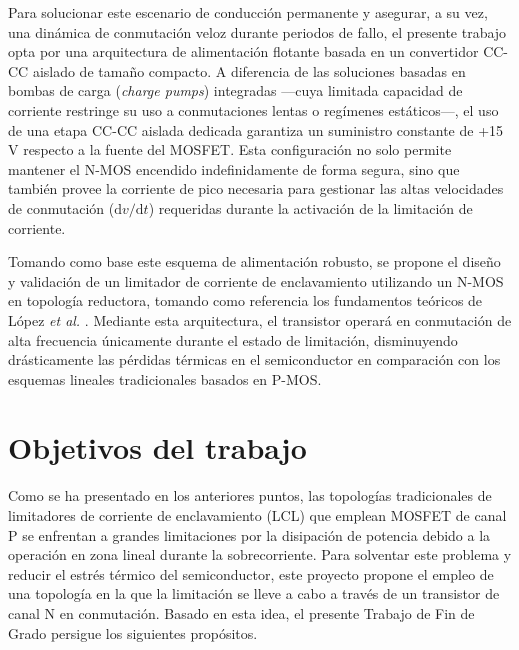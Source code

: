 \documentclass[12pt]{report} %
\begin{document}
Para solucionar este escenario de conducción permanente y asegurar, a su vez, una dinámica de conmutación veloz durante periodos de fallo, el presente trabajo opta por una arquitectura de alimentación flotante basada en un convertidor CC-CC aislado de tamaño compacto. A diferencia de las soluciones basadas en bombas de carga (\textit{charge pumps}) integradas —cuya limitada capacidad de corriente restringe su uso a conmutaciones lentas o regímenes estáticos—, el uso de una etapa CC-CC aislada dedicada garantiza un suministro constante de +15 V respecto a la fuente del MOSFET. Esta configuración no solo permite mantener el N-MOS encendido indefinidamente de forma segura, sino que también provee la corriente de pico necesaria para gestionar las altas velocidades de conmutación ($\text{d}v/\text{d}t$) requeridas durante la activación de la limitación de corriente.

Tomando como base este esquema de alimentación robusto, se propone el diseño y validación de un limitador de corriente de enclavamiento utilizando un N-MOS en topología reductora, tomando como referencia los fundamentos teóricos de López \textit{et al.} \cite{lopez_antuna_diseno_2024}. Mediante esta arquitectura, el transistor operará en conmutación de alta frecuencia únicamente durante el estado de limitación, disminuyendo drásticamente las pérdidas térmicas en el semiconductor en comparación con los esquemas lineales tradicionales basados en P-MOS.

\section{Objetivos del trabajo}

Como se ha presentado en los anteriores puntos, las topologías tradicionales de limitadores de corriente de enclavamiento (LCL) que emplean MOSFET de canal P se enfrentan a grandes limitaciones por la disipación de potencia debido a la operación en zona lineal durante la sobrecorriente. Para solventar este problema y reducir el estrés térmico del semiconductor, este proyecto propone el empleo de una topología en la que la limitación se lleve a cabo a través de un transistor de canal N en conmutación. Basado en esta idea, el presente Trabajo de Fin de Grado persigue los siguientes propósitos.
 
\end{document}
